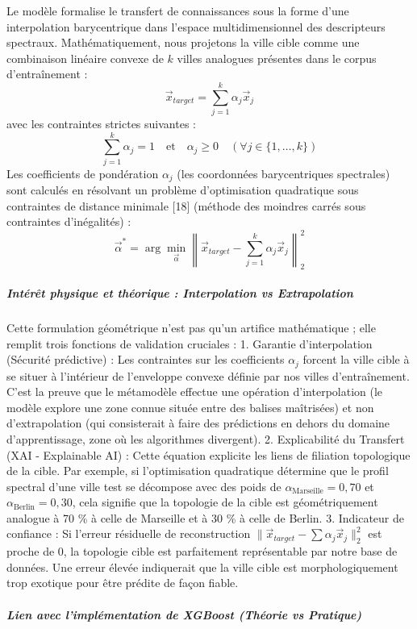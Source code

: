 \documentclass[10pt, a4paper]{article}
\begin{document}
Le modèle formalise le transfert de connaissances sous la forme d'une
interpolation barycentrique dans l'espace multidimensionnel des
descripteurs spectraux. Mathématiquement, nous projetons la ville cible
comme une combinaison linéaire convexe de \(k\) villes analogues
présentes dans le corpus d'entraînement :
\[\vec{x}_{target} = \sum_{j=1}^k \alpha_j \vec{x}_j\] avec les
contraintes strictes suivantes :
\[\sum_{j=1}^k \alpha_j = 1 \quad \text{et} \quad \alpha_j \ge 0 \quad (\forall j \in \{1, \dots, k\})\]
Les coefficients de pondération \(\alpha_j\) (les coordonnées
barycentriques spectrales) sont calculés en résolvant un problème
d'optimisation quadratique sous contraintes de distance minimale
{[}18{]} (méthode des moindres carrés sous contraintes d'inégalités) :
\[\vec{\alpha}^* = \arg\min_{\vec{\alpha}} \left\| \vec{x}_{target} - \sum_{j=1}^k \alpha_j \vec{x}_j \right\|_2^2\]

\subparagraph{Intérêt physique et théorique : Interpolation vs
Extrapolation}\label{intuxe9ruxeat-physique-et-thuxe9orique-interpolation-vs-extrapolation}

Cette formulation géométrique n'est pas qu'un artifice mathématique ;
elle remplit trois fonctions de validation cruciales : 1. Garantie
d'interpolation (Sécurité prédictive) : Les contraintes sur les
coefficients \(\alpha_j\) forcent la ville cible à se situer à
l'intérieur de l'enveloppe convexe définie par nos villes
d'entraînement. C'est la preuve que le métamodèle effectue une opération
d'interpolation (le modèle explore une zone connue située entre des
balises maîtrisées) et non d'extrapolation (qui consisterait à faire des
prédictions en dehors du domaine d'apprentissage, zone où les
algorithmes divergent). 2. Explicabilité du Transfert (XAI - Explainable
AI) : Cette équation explicite les liens de filiation topologique de la
cible. Par exemple, si l'optimisation quadratique détermine que le
profil spectral d'une ville test se décompose avec des poids de
\(\alpha_{\text{Marseille}} = 0,70\) et
\(\alpha_{\text{Berlin}} = 0,30\), cela signifie que la topologie de la
cible est géométriquement analogue à 70 \% à celle de Marseille et à 30
\% à celle de Berlin. 3. Indicateur de confiance : Si l'erreur
résiduelle de reconstruction
\(\|\vec{x}_{target} - \sum \alpha_j \vec{x}_j\|_2^2\) est proche de 0,
la topologie cible est parfaitement représentable par notre base de
données. Une erreur élevée indiquerait que la ville cible est
morphologiquement trop exotique pour être prédite de façon fiable.

\subparagraph{Lien avec l'implémentation de XGBoost (Théorie vs
Pratique)}\label{lien-avec-limpluxe9mentation-de-xgboost-thuxe9orie-vs-pratique}
\end{document}
